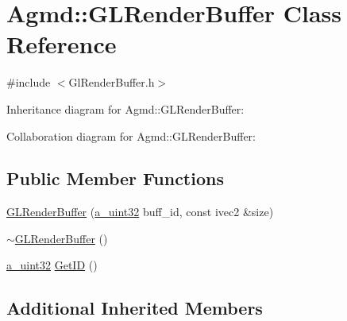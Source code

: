 \hypertarget{class_agmd_1_1_g_l_render_buffer}{\section{Agmd\+:\+:G\+L\+Render\+Buffer Class Reference}
\label{class_agmd_1_1_g_l_render_buffer}
}


{\ttfamily \#include $<$Gl\+Render\+Buffer.\+h$>$}



Inheritance diagram for Agmd\+:\+:G\+L\+Render\+Buffer\+:


Collaboration diagram for Agmd\+:\+:G\+L\+Render\+Buffer\+:
\subsection*{Public Member Functions}
\begin{DoxyCompactItemize}
\item 
\hyperlink{class_agmd_1_1_g_l_render_buffer_ad889b8d7dbfc3993617319f5038cb61f}{G\+L\+Render\+Buffer} (\hyperlink{_common_defines_8h_a964296f9770051b9e4807b1f180dd416}{a\+\_\+uint32} buff\+\_\+id, const ivec2 \&size)
\item 
\hyperlink{class_agmd_1_1_g_l_render_buffer_afc90b353354f7244a5eae43726d0cede}{$\sim$\+G\+L\+Render\+Buffer} ()
\item 
\hyperlink{_common_defines_8h_a964296f9770051b9e4807b1f180dd416}{a\+\_\+uint32} \hyperlink{class_agmd_1_1_g_l_render_buffer_a78f1f2fcffba0ab540f4ec27db53cb86}{Get\+I\+D} ()
\end{DoxyCompactItemize}
\subsection*{Additional Inherited Members}


